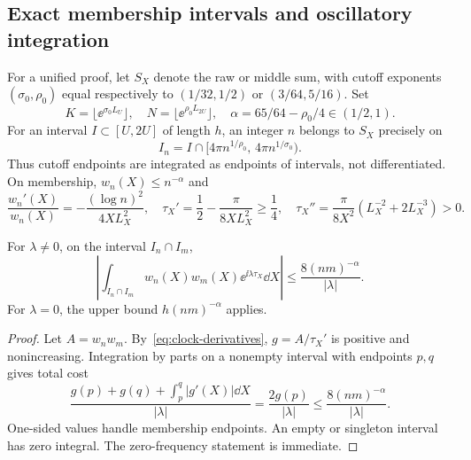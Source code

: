 \subsection{Exact membership intervals and oscillatory integration}

For a unified proof, let $S_X$ denote the raw or middle sum, with
cutoff exponents $(\sigma_0,\rho_0)$ equal respectively to
$(1/32,1/2)$ or $(3/64,5/16)$. Set
\[
 K=\lfloor\ee^{\sigma_0L_U}\rfloor,\quad
 N=\lfloor\ee^{\rho_0L_{2U}}\rfloor,\quad
 \alpha=65/64-\rho_0/4\in(1/2,1).
\]
For an interval $I\subset[U,2U]$ of length $h$, an integer $n$
belongs to $S_X$ precisely on
\begin{equation}\label{eq:membership}
 I_n=I\cap[4\pi n^{1/\rho_0},\,4\pi n^{1/\sigma_0}).
\end{equation}
Thus cutoff endpoints are integrated as endpoints of intervals, not
differentiated. On membership, $w_n(X)\le n^{-\alpha}$ and
\begin{equation}\label{eq:clock-derivatives}
 \frac{w_n'(X)}{w_n(X)}=-\frac{(\log n)^2}{4XL_X^2},\quad
 \tau_X'=\frac12-\frac{\pi}{8XL_X^2}\ge\frac14,\quad
 \tau_X''=\frac{\pi}{8X^2}(L_X^{-2}+2L_X^{-3})>0.
\end{equation}

\begin{lemma}\label{lem:pair-integration}
For $\lambda\ne0$, on the interval $I_n\cap I_m$,
\begin{equation}\label{eq:pair-integral}
 \left|\int_{I_n\cap I_m}w_n(X)w_m(X)
                   \ee^{\ii\lambda\tau_X}\dd X\right|
 \le\frac{8(nm)^{-\alpha}}{|\lambda|}.
\end{equation}
For $\lambda=0$, the upper bound $h(nm)^{-\alpha}$ applies.
\end{lemma}
\begin{proof}
Let $A=w_nw_m$. By~\eqref{eq:clock-derivatives},
$g=A/\tau_X'$ is positive and nonincreasing. Integration by parts
on a nonempty interval with endpoints $p,q$ gives total cost
\[
 \frac{g(p)+g(q)+\int_p^q|g'(X)|\dd X}{|\lambda|}
 =\frac{2g(p)}{|\lambda|}\le\frac{8(nm)^{-\alpha}}{|\lambda|}.
\]
One-sided values handle membership endpoints. An empty or singleton
interval has zero integral. The zero-frequency statement is immediate.
\end{proof}

